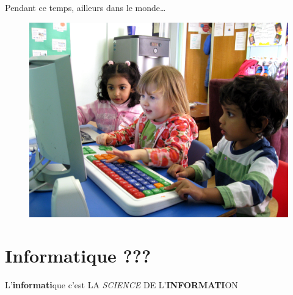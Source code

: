 \documentclass[french,handout]{beamer}
\begin{document}
\begin{frame}
Pendant ce temps, ailleurs dans le monde\ldots{}
\pause
\begin{figure}
\centering
\includegraphics[height=0.7\textheight]{./kids.JPG}
\end{figure}

\end{frame}




\section{Informatique ???}




\begin{frame}
L'\textbf{informati}que c'est LΑ \emph{SCIENCΕ} DΕ
L'\textbf{INFORMATI}ON
\end{frame}
\end{document}
